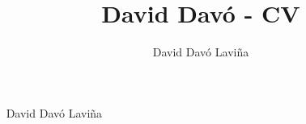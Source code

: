 \documentclass[11pt, a4paper]{awesome-cv}
\title{David Davó - CV}
\author{David Davó Laviña}
\begin{document}
\makecvheader[C]

\makecvfooter
  {\monthname\ \number\year}
  {David Davó Laviña}
  {\thepage}




\newpage





\end{document}
